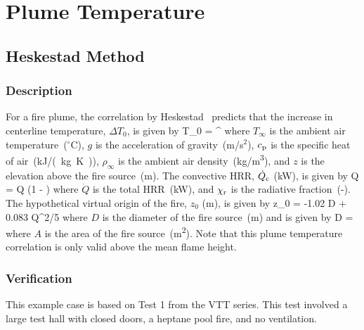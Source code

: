 
\chapter{Plume Temperature}
\label{Plume_Chapter}

\section{Heskestad Method}

\subsection*{Description}

For a fire plume, the correlation by Heskestad~\cite{SFPE:Heskestad} predicts that the increase in centerline temperature, $\Delta T_0$, is given by
\be
\Delta T_0 =  \quad ^
\label{eq:Heskestad}
\ee
where $T_\infty$ is the ambient air temperature~($^\circ$C), $g$ is the acceleration of gravity~(m/s$^2$), $c\sb{p}$ is the specific heat of air~(\si{kJ/(kg.K)}), $\rho_{\infty}$ is the ambient air density~(\si{kg/m^3}), and $z$ is the elevation above the fire source~(\si{m}). The convective HRR, $\dot Q\sb{c}$ (\si{kW}), is given by
\be
\dot Q = \dot Q (1 - \chi{})
\label{eq:Heskestad_Qc}
\ee
where $\dot Q$ is the total HRR~(\si{kW}), and $\chi\sb{r}$ is the radiative fraction~(-). The hypothetical virtual origin of the fire, $z_0$ (\si{m}), is given by
\be
z_0 = -1.02 D + 0.083 \dot Q^{2/5}
\label{eq:Heskestad_z0}
\ee
where $D$ is the diameter of the fire source~(\si{m}) and is given by
\be
D = 
\label{eq:Heskestad_D}
\ee
where $A$ is the area of the fire source~(\si{m^2}).
Note that this plume temperature correlation is only valid above the mean flame height.


\clearpage


\subsection*{Verification}

This example case is based on Test 1 from the VTT series. This test involved a large test hall with closed doors, a heptane pool fire, and no ventilation.

